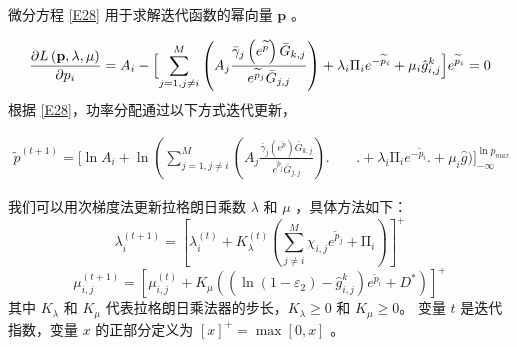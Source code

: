 微分方程 \eqref{E28} 用于求解迭代函数的幂向量 $\mathbf{p}$ 。

\begin{align}\label{E28}
\frac{\partial L\left(\mathbf{p},\lambda,\mu\right)}{\partial p_i}=A_i-\Bigl[\sum_{j=1,j\neq i}^{M}\left(A_j\frac{{\bar{\gamma}}_j\left(e^{\widetilde{p}}\right){\bar{G}}_{k,j}}{e^{{\widetilde{p}}_j}{\bar{G}}_{j,j}}\right)
+\lambda_i\mathrm{\Pi}_ie^{-{\widetilde{p}}_i}+\mu_i{\hat{g}}_{i,j}^k\Bigl]e^{{\widetilde{p}}_i}=0
\end{align}
根据 \eqref{E28}，功率分配通过以下方式迭代更新，

\begin{align}\label{E29}
{\widetilde{p}}^{\left(t+1\right)}=\Big[\ln{A_i}+\ln\left(\sum_{j=1,j\neq i}^{M}\left(A_j\frac{{\bar{\gamma}}_j\left(e^{\widetilde{p}}\right){\bar{G}}_{k,j}}{e^{{\widetilde{p}}_j}{\bar{G}}_{j,j}}\right)\Big.\right.\phantom{=\;\;}\Big.\!\!\!\!\!\!\!\!\!\!\!+\lambda_i\mathrm{\Pi}_ie^{-{\widetilde{p}}_i}\Big.+\mu_i\hat{g}\Big)
\Big]_{-\infty}^{\ln{p_{max}}}
\end{align}

我们可以用次梯度法更新拉格朗日乘数 $\lambda$ 和 $\mu$ ，具体方法如下：
\begin{equation}\label{E30}
\lambda_i^{\left(t+1\right)}=\left[\lambda_i^{\left(t\right)}+K_\lambda^{\left(t\right)}\left(\sum_{j\neq i}^{M}{\chi_{i,j}e^{{\widetilde{p}}_j}}+\mathrm{\Pi}_i\right)\right]^+
\end{equation}
\begin{equation}\label{E31}
\mu_{i,j}^{\left(t+1\right)}=\!\left[\mu_{i,j}^{\left(t\right)}+\!K_\mu\!\left(\left(\ln\left(1-\varepsilon_2\right)-{\hat{g}}_{i,j}^k\right)e^{{\widetilde{p}}_i}+D^\ast\right)\right]^+
\end{equation}
其中 $K_\lambda$ 和 $K_\mu$ 代表拉格朗日乘法器的步长，$K_\lambda\geq0$ 和 $K_\mu\geq0$。 变量 $t$ 是迭代指数，变量 $x$ 的正部分定义为 $\left[x\right]^+=\max{\left[0,x\right]} $ 。
